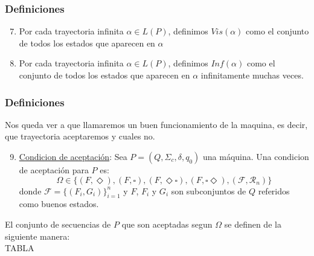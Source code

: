 \begin{frame}[plain]
\frametitle{Definiciones}
\begin{enumerate}
   \setcounter{enumi}{6}
   \item Por cada trayectoria infinita $\alpha \in L(P)$, definimos $Vis(\alpha)$ como el conjunto de todos los estados que aparecen en $\alpha$
\vspace{3 mm}
   \item Por cada trayectoria infinita $\alpha \in L(P)$, definimos $Inf(\alpha)$ como el conjunto de todos los estados que aparecen en $\alpha$ infinitamente muchas veces.
\end{enumerate}
\end{frame}

\begin{frame}[plain]
\frametitle{Definiciones}
Nos queda ver a que llamaremos un buen funcionamiento de la maquina, es decir, que trayectoria aceptaremos y cuales no.
\begin{enumerate}
   \setcounter{enumi}{8}
   \item \underline{Condicion de aceptación}: Sea $P = (Q,\Sigma_c,\delta,q_0)$ una máquina. Una condicion de aceptación para $P$ es:
   \begin{equation}
      \Omega \in \{(F,\Diamond),(F,\square),(F,\Diamond\square),(F,\square\Diamond),(\mathcal{F},\mathcal{R}_{n})\}
   \end{equation}
   donde $\mathcal{F} = \{(F_i,G_i)\}^{n}_{i=1}$ y $F$, $F_i$ y $G_i$ son subconjuntos de $Q$ referidos como buenos estados.\\
\end{enumerate}
   El conjunto de secuencias de $P$ que son aceptadas segun $\Omega$ se definen de la siguiente manera:\\
   TABLA

\end{frame}

